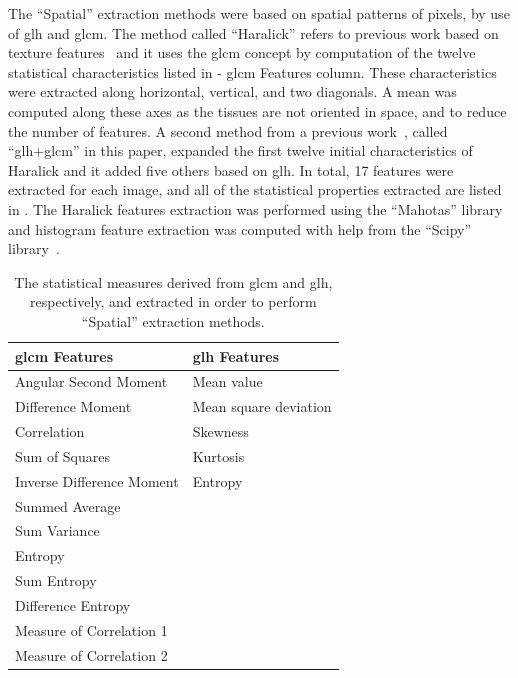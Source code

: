 \documentclass[journal,article,accept,moreauthors,pdftex, applsci]{Definitions/mdpi}
\begin{document}
The “Spatial” extraction methods were based on spatial patterns of pixels, by use of \ac{glh} and \ac{glcm}. The method called “Haralick” refers to previous work based on texture features~\cite{Haralick1973} and it uses the \ac{glcm} concept by computation of the twelve statistical characteristics listed in  - \ac{glcm} Features column. These characteristics were extracted along horizontal, vertical, and two diagonals. A mean was computed along these axes as the tissues are not oriented in space, and to reduce the number of features. A second method from a previous work~\cite{Wiltgen2008}, called “\ac{glh}+\ac{glcm}” in this paper, expanded the first twelve initial characteristics of Haralick and it added five others based on \ac{glh}. In total, 17 features were extracted for each image, and all of the statistical properties extracted are listed in . The Haralick features extraction was performed using the “Mahotas” library~\cite{coelho2012mahotas} and histogram feature extraction was computed with help from the “Scipy” library~\cite{Jones2001}.\par
\begin{table}[H]
    \centering
    \begin{tabular}{ll}
        \hline
        \textbf{\ac{glcm} Features}& \textbf{\ac{glh} Features}     \\ \hline
        Angular Second Moment      & Mean value                     \\
        Difference Moment          & Mean square deviation          \\
        Correlation                & Skewness                       \\
        Sum of Squares             & Kurtosis                       \\
        Inverse Difference Moment  & Entropy                        \\     
        Summed Average             &                                \\    
        Sum Variance               &                                \\    
        Entropy                    &                                \\    
        Sum Entropy                &                                \\    
        Difference Entropy         &                                \\    
        Measure of Correlation 1   &                                \\  
        Measure of Correlation 2   &                                \\ 
    \end{tabular}
    \caption{The statistical measures derived from \ac{glcm} and \ac{glh}, respectively, and extracted in order to perform “Spatial” extraction methods.}
    \label{tab:histogram_features}
\end{table}\par
\end{document}
